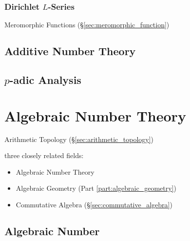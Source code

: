 \subsubsection{Dirichlet $L$-Series}\label{sec:l_series}

Meromorphic Functions (\S\ref{sec:meromorphic_function})



\subsection{Additive Number Theory}\label{sec:additive_number_theory}

\subsection{$p$-adic Analysis}\label{sec:padic_analysis}



\section{Algebraic Number Theory}\label{sec:algebraic_number_theory}

Arithmetic Topology (\S\ref{sec:arithmetic_topology})

three closely related fields:
\begin{itemize}
  \item Algebraic Number Theory
  \item Algebraic Geometry (Part \ref{part:algebraic_geometry})
  \item Commutative Algebra (\S\ref{sec:commutative_algebra})
\end{itemize}



\subsection{Algebraic Number}\label{sec:algebraic_number}

